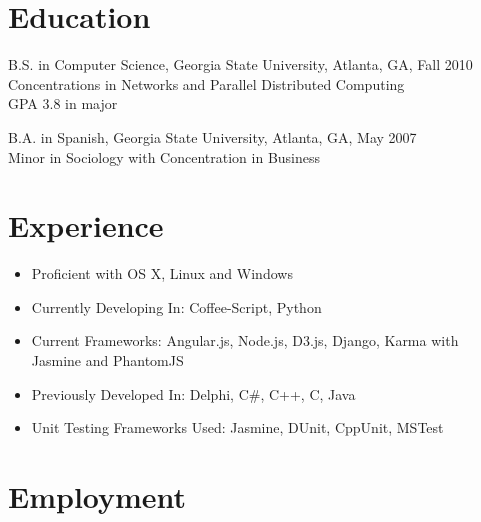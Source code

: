 \documentclass[margin]{res}
\begin{document}

\address{204 Drexel Ave Apt B \\ Decatur, GA 30030  \\
        (678) 773-1545 }

\begin{resume}

\section{Education}
    B.S. in Computer Science, Georgia State University, Atlanta, GA, Fall 2010  \\
    Concentrations in Networks and Parallel Distributed Computing \\
    GPA 3.8 in major

    B.A. in Spanish, Georgia State University, Atlanta, GA, May 2007 \\
    Minor in Sociology with Concentration in Business


\section{Experience}
    \begin{itemize} \itemsep -2pt  %
        \item Proficient with OS X, Linux and Windows
        \item Currently Developing In: Coffee-Script, Python
        \item Current Frameworks: Angular.js, Node.js, D3.js, Django, Karma
            with Jasmine and PhantomJS
        \item Previously Developed In: Delphi, C\#, C++, C, Java
        \item Unit Testing Frameworks Used: Jasmine, DUnit, CppUnit, MSTest
    \end{itemize}

\section{Employment}


\end{resume}
\end{document}
